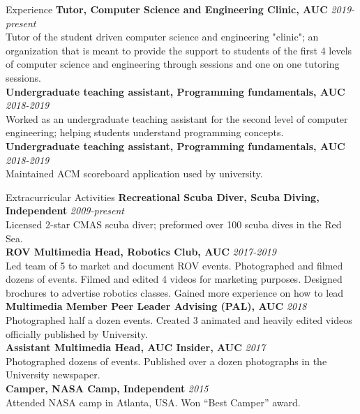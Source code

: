 \documentclass{resume}
\begin{document}
\begin{small}
	\begin{rSection}{Experience}
		{\bf Tutor, Computer Science and Engineering Clinic, AUC} \hfill {\em 2019-present} \\
		Tutor of the student driven computer science and engineering "clinic"; an organization that is meant to provide the support to students of the first 4 levels of computer science and engineering through sessions and one on one tutoring sessions.\\
		{\bf Undergraduate teaching assistant, Programming fundamentals, AUC} \hfill {\em 2018-2019} \\
		Worked as an undergraduate teaching assistant for the second level of computer engineering; helping students understand programming concepts.\\
		{\bf Undergraduate teaching assistant, Programming fundamentals, AUC} \hfill {\em 2018-2019} \\
		Maintained ACM scoreboard application used by university.\\
	\end{rSection}
	\begin{rSection} {Extracurricular Activities}
		{\bf Recreational Scuba Diver, Scuba Diving, Independent} \hfill {\em 2009-present}\\
		Licensed 2-star CMAS scuba diver; preformed over 100 scuba dives in the Red Sea.\\
		{\bf ROV Multimedia Head, Robotics Club, AUC} \hfill {\em 2017-2019} \\
		Led team of 5 to market and document ROV events. Photographed and filmed dozens of events. Filmed and edited 4 videos for marketing purposes. Designed brochures to advertise robotics classes. Gained more experience on how to lead\\
		{\bf Multimedia Member Peer Leader Advising (PAL), AUC} \hfill {\em 2018}\\
		Photographed half a dozen events. Created 3 animated and heavily edited videos officially published by University.\\
		{\bf Assistant Multimedia Head, AUC Insider, AUC} \hfill {\em 2017}\\
		Photographed dozens of events. Published over a dozen photographs in the University newspaper.\\
		{\bf Camper, NASA Camp, Independent} \hfill {\em 2015}\\
		Attended NASA camp in Atlanta, USA. Won “Best Camper” award.\\
		

\end{rSection}
\end{small}
\end{document}
